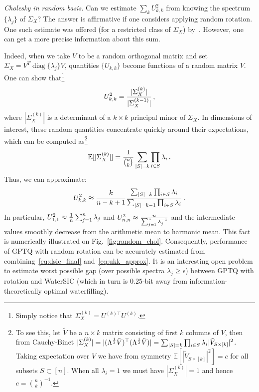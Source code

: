\documentclass[journal]{IEEEtran}
\newcommand{\diag}{\mathop{\mathrm{diag}}}
\newcommand{\trace}{\mathop{\mathrm{tr}}}
\def\EE{\mathbb{E}}
\newcommand{\OrComm}[1]{{\color{blue} [ \textbf{Or:} #1}]}
\begin{document}
\textit{Cholesky in random basis.} Can we estimate $\sum_k U_{k,k}^2$ from knowing the spectrum
$\{\lambda_j\}$ of $\Sigma_X$? The answer is affirmative if one considers applying random
rotation. One such estimate was offered (for a restricted class of $\Sigma_X$) by~\cite[Lemma
2]{chee2023quip}. However, one can get a more precise information about this sum.

Indeed, when we take $V$
to be a random orthogonal matrix and set $\Sigma_X = V^T \diag\{\lambda_j\} V$, quantities
$\{U_{k,k}\}$ become functions of a random matrix $V$. One can show that\footnote{Simply notice
that $\Sigma_X^{(k)} = U^{(k)\top} U^{(k)}$.} 
$$ U_{k,k}^2 = {|\Sigma_X^{(k)}|\over |\Sigma_X^{(k-1)}|}\,,$$
where $|\Sigma_X^{(k)}|$ is a determinant of a $k \times k$ principal minor of $\Sigma_X$. In dimensions of interest,
these random quantities concentrate quickly around their expectations, which can be computed
as\footnote{To see this, let $\tilde V$ be a $n\times k$ matrix consisting of first $k$ columns of
$V$, then from Cauchy-Binet $|\Sigma_X^{(k)}|=|(\Lambda^{1\over 2} \tilde V)^\top
(\Lambda^{1\over2} \tilde V)| =
\sum_{|S|=k} \prod_{i\in S} \lambda_i |\tilde V_{S\times [k]}|^2$. Taking expectation over $V$ we
have from symmetry $\EE[|\tilde V_{S\times [k]}|^2] = c$ for all subsets $S\subset [n]$. When all
$\lambda_i=1$ we must have $|\Sigma_X^{(k)}|=1$ and hence $c={n\choose k}^{-1}$.}
$$ \EE[|\Sigma_X^{(k)}|] = {1\over {n\choose k}} \sum_{|S|=k} \prod_{i\in S} \lambda_i\,.$$
Thus, we can approximate:
\begin{equation}\label{eq:ukk_approx}
	U_{k,k}^2 \approx {k \over n-k+1}  {\sum_{|S|=k} \prod_{i\in S} \lambda_i\over \sum_{|S|=k-1}
\prod_{i\in S} \lambda_i}\,.
\end{equation}
In particular, $U_{1,1}^2 \approx {1\over n} \sum_{j=1}^n \lambda_j$ and $U_{n,n}^2 \approx
{n\over \sum_{j=1}^n \lambda_j^{-1}}$ and the intermediate values smoothly decrease from the
arithmetic mean to harmonic mean. This fact is numerically illustrated on
Fig.~\ref{fig:random_chol}. Consequently, performance of GPTQ with random rotation can be
accurately estimated from combining~\eqref{eq:dsic_final} and~\eqref{eq:ukk_approx}. It is an
interesting open problem to estimate worst possible gap (over possible spectra $\lambda_j \ge
\epsilon$)
between GPTQ with rotation and WaterSIC (which in turn is $0.25$-bit away from
information-theoretically optimal waterfilling). %
\end{document}
